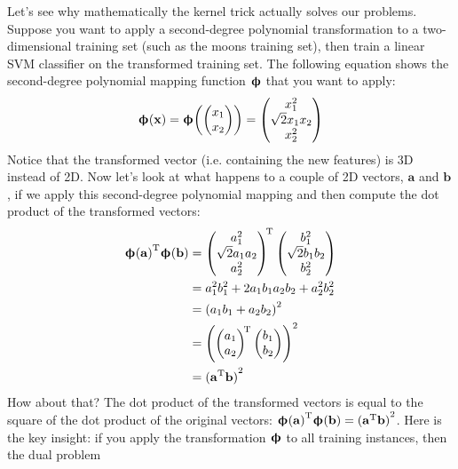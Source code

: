 Let's see why mathematically the kernel trick actually solves our problems. Suppose you want to apply a second-degree polynomial transformation to a two-dimensional training set (such as the moons training set), then train a linear SVM classifier on the transformed training set. The following equation shows the second-degree polynomial mapping function $\boldsymbol{\upphi}$ that you want to apply:
\begin{equation}\label{2ndpolynomial}
\boldsymbol{\upphi}(\mathbf{x})=\boldsymbol{\upphi}\!\left(\begin{pmatrix}x_1\\x_2\end{pmatrix}\right)=\begin{pmatrix}x_1^2\\ \sqrt{2}x_1x_2\\x_2^2\end{pmatrix}
\end{equation}
Notice that the transformed vector (i.e. containing the new features) is 3D instead of 2D. Now let's look at what happens to a couple of 2D vectors, $\mathbf{a}$ and $\mathbf{b}$, if we apply this second-degree polynomial mapping and then compute the dot product of the transformed vectors:
\begin{equation}
\begin{split}
{\boldsymbol{\upphi}(\mathbf{a})}^{\mathrm{T}}\boldsymbol{\upphi}(\mathbf{b})&={\begin{pmatrix}a_1^2\\ \sqrt{2}a_1a_2\\a_2^2\end{pmatrix}\!}^{\mathrm{T}}\begin{pmatrix}b_1^2\\ \sqrt{2}b_1b_2\\b_2^2\end{pmatrix}\\
&=a_1^2b_1^2+2a_1b_1a_2b_2+a_2^2b_2^2\\
&={(a_1b_1+a_2b_2)}^2\\
&={\left({\begin{pmatrix}a_1\\a_2\end{pmatrix}\!}^{\mathrm{T}}\begin{pmatrix}b_1\\b_2\end{pmatrix}\right)}^2\\
&={(\mathbf{a}^{\mathrm{T}}\mathbf{b})}^2
\end{split}
\end{equation}
How about that? The dot product of the transformed vectors is equal to the square of the dot product of the original vectors: ${\boldsymbol{\upphi}(\mathbf{a})}^{\mathrm{T}}\boldsymbol{\upphi}(\mathbf{b})={(\mathbf{a}^{\mathrm{T}}\mathbf{b})}^2$. Here is the key insight: if you apply the transformation $\boldsymbol{\upphi}$ to all training instances, then the dual problem
